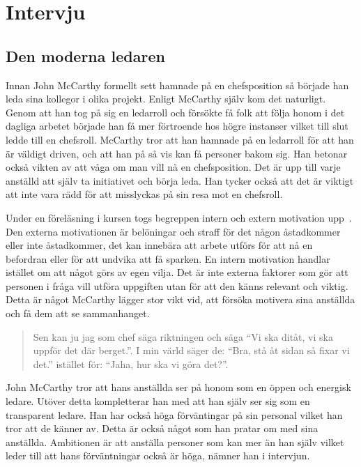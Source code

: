 \section{Intervju}
\label{sec:intervju}


\subsection{Den moderna ledaren}
Innan John McCarthy formellt sett hamnade på en chefsposition så började han leda sina kollegor i olika projekt. Enligt McCarthy själv kom det naturligt. Genom att han tog på sig en ledarroll och försökte få folk att följa honom i det dagliga arbetet började han få mer förtroende hos högre instanser vilket till slut ledde till en chefsroll. McCarthy tror att han hamnade på en ledarroll för att han är väldigt driven, och att han på så vis kan få personer bakom sig. Han betonar också vikten av att våga om man vill nå en chefsposition. Det är upp till varje anställd att själv ta initiativet och börja leda. Han tycker också att det är viktigt att inte vara rädd för att misslyckas på sin resa mot en chefsroll.


Under en föreläsning i kursen togs begreppen intern och extern motivation upp~\citep{motivation}. Den externa motivationen är belöningar och straff för det någon åstadkommer eller inte åstadkommer, det kan innebära att arbete utförs för att nå en befordran eller för att undvika att få sparken. En intern motivation handlar istället om att något görs av egen vilja. Det är inte externa faktorer som gör att personen i fråga vill utföra uppgiften utan för att den känns relevant och viktig. Detta är något McCarthy lägger stor vikt vid, att försöka motivera sina anställda och få dem att se sammanhanget.

\begin{quote}
 Sen kan ju jag som chef säga riktningen och säga ``Vi ska ditåt, vi ska uppför det där berget.''. I min värld säger de: ``Bra, stå åt sidan så fixar vi det.'' istället för: ``Jaha, hur ska vi göra det?''.
\end{quote}

John McCarthy tror att hans anställda ser på honom som en öppen och energisk ledare. Utöver detta kompletterar han med att han själv ser sig som en transparent ledare. Han har också höga förväntingar på sin personal vilket han tror att de känner av. Detta är också något som han pratar om med sina anställda. Ambitionen är att anställa personer som kan mer än han själv vilket leder till att hans förväntningar också är höga, nämner han i intervjun.

